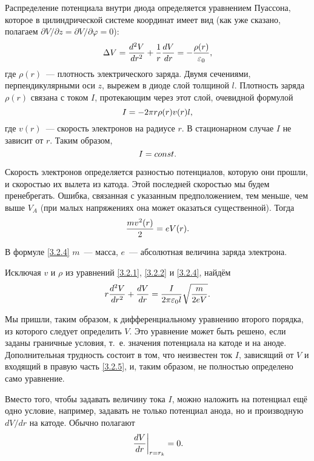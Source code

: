 Распределение потенциала внутри диода определяется уравнением Пуассона, которое в цилиндрической системе координат имеет вид (как уже сказано, полагаем $\partial V/\partial z=\partial V/\partial\varphi=0$):
\begin{equation}
	\Delta V=\frac{d^2 V}{dr^2}+\frac{1}{r}\frac{dV}{dr}=-\frac{\rho(r)}{\varepsilon_0},
	\eqmark{3.2.1}
\end{equation}
где $\rho(r)$~--- плотность электрического заряда. Двумя сечениями, перпендикулярными оси $z$, вырежем в диоде слой
толщиной $l$. Плотность заряда $\rho(r)$ связана с током $I$, протекающим через этот слой, очевидной формулой
\begin{equation}
	I=-2\pi r\rho(r)v(r)l,
	\eqmark{3.2.2}
\end{equation}
где $v(r)$~--- скорость электронов на радиусе $r$. В стационарном случае $I$ не зависит от $r$. Таким образом,
\begin{equation}
	I=const.
	\eqmark{3.2.3}
\end{equation}

Скорость электронов определяется разностью потенциалов, которую они прошли, и скоростью их вылета из катода. Этой
последней скоростью мы будем пренебрегать. Ошибка, связанная с указанным предположением, тем меньше, чем выше $V_A$ (при малых напряжениях она может оказаться существенной). Тогда
\begin{equation}
	\frac{mv^2(r)}{2}=eV(r).
	\eqmark{3.2.4}
\end{equation}

В формуле \eqref{3.2.4} $m$~--- масса, $e$~--- абсолютная величина заряда электрона.

Исключая $v$ и $\rho$ из уравнений \eqref{3.2.1}, \eqref{3.2.2} и \eqref{3.2.4}, найдём
\begin{equation}
	r\frac{d^2V}{dr^2}+\frac{dV}{dr}=\frac{I}{2\pi\varepsilon_0l}\sqrt{\frac{m}{2eV}}.
	\eqmark{3.2.5}
\end{equation}

Мы пришли, таким образом, к дифференциальному уравнению второго порядка, из которого следует определить $V$. Это
уравнение может быть решено, если заданы граничные условия, т.~е. значения потенциала на катоде и на аноде.
Дополнительная трудность состоит в том, что неизвестен ток $I$, зависящий от $V$ и входящий в правую часть \eqref{3.2.5}, и, таким образом, не полностью определено само уравнение.

Вместо того, чтобы задавать величину тока $I$, можно наложить на потенциал ещё одно условие, например, задавать не только потенциал анода, но и производную $dV/dr$ на катоде. Обычно полагают
\begin{equation}
	\left.\frac{dV}{dr}\right|_{r=r_k}=0.
	\eqmark{3.2.6}
\end{equation}

